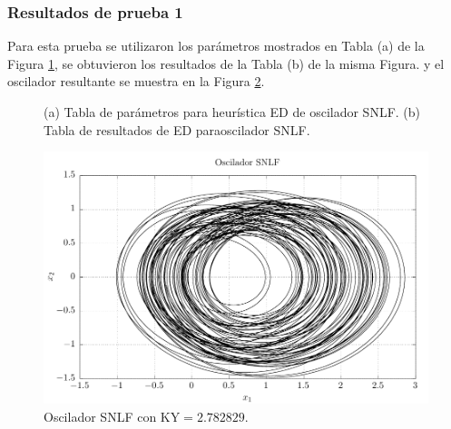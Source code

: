 \documentclass[10pt,a4paper]{article}
\begin{document}
\subsubsection{Resultados de prueba 1}
Para esta prueba se utilizaron los parámetros mostrados en Tabla (a) de la Figura \ref{fig:tabs_res1}, se obtuvieron los resultados de la Tabla (b) de la misma Figura. y el oscilador resultante se muestra en la Figura \ref{fig:res1}.
\begin{figure}[htp]
	\centering
	\hspace{2cm}
	\caption{(a) Tabla de parámetros para heurística ED de oscilador SNLF. (b) Tabla de resultados de ED paraoscilador SNLF.}
	\label{fig:tabs_res1}
\end{figure}

\begin{figure}[htp]
	\centering
	\includegraphics[width=.5\textwidth]{imagenes/super1.pdf}
	\caption{Oscilador SNLF con KY$ = 2.782829$.}
	\label{fig:res1}
\end{figure}
\end{document}
